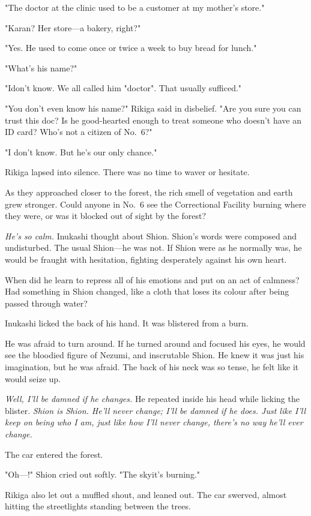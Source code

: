 "The doctor at the clinic used to be a customer at my mother's store."

"Karan? Her store---a bakery, right?"

"Yes. He used to come once or twice a week to buy bread for lunch."

"What's his name?"

"I\el don't know. We all called him "doctor". That usually sufficed."

"You don't even know his name?" Rikiga said in disbelief. "Are you sure
you can trust this doc? Is he good-hearted enough to treat someone who
doesn't have an ID card? Who's not a citizen of No.~6?"

"I don't know. But he's our only chance."

Rikiga lapsed into silence. There was no time to waver or hesitate.

As they approached closer to the forest, the rich smell of vegetation
and earth grew stronger. Could anyone in No.~6 see the Correctional
Facility burning where they were, or was it blocked out of sight by the
forest?

\emph{He's so calm.} Inukashi thought about Shion. Shion's words were composed
and undisturbed. The usual Shion---he was not. If Shion were as he
normally was, he would be fraught with hesitation, fighting desperately
against his own heart.

When did he learn to repress all of his emotions and put on an act of
calmness? Had something in Shion changed, like a cloth that loses its
colour after being passed through water?

Inukashi licked the back of his hand. It was blistered from a burn.

He was afraid to turn around. If he turned around and focused his eyes,
he would see the bloodied figure of Nezumi, and inscrutable Shion. He
knew it was just his imagination, but he was afraid. The back of his
neck was so tense, he felt like it would seize up.

\emph{Well, I'll be damned if he changes.} He repeated inside his head while
licking the blister. \emph{Shion is Shion. He'll never change; I'll be damned
if he does. Just like I'll keep on being who I am, just like how I'll
never change, there's no way he'll ever change.}

The car entered the forest.

"Oh---!" Shion cried out softly. "The sky\el it's burning."

Rikiga also let out a muffled shout, and leaned out. The car swerved,
almost hitting the streetlights standing between the trees.

